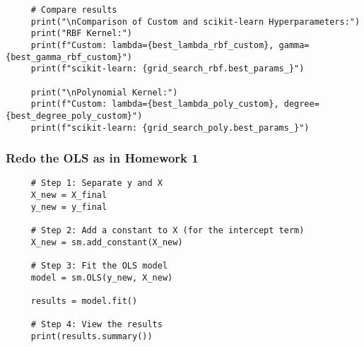 \documentclass[letterpaper]{article}
\begin{document}
\begin{lstlisting}
     # Compare results
     print("\nComparison of Custom and scikit-learn Hyperparameters:")
     print("RBF Kernel:")
     print(f"Custom: lambda={best_lambda_rbf_custom}, gamma={best_gamma_rbf_custom}")
     print(f"scikit-learn: {grid_search_rbf.best_params_}")
     
     print("\nPolynomial Kernel:")
     print(f"Custom: lambda={best_lambda_poly_custom}, degree={best_degree_poly_custom}")
     print(f"scikit-learn: {grid_search_poly.best_params_}")
\end{lstlisting}
\subsubsection{Redo the OLS as in Homework 1}
\begin{lstlisting}
     # Step 1: Separate y and X
     X_new = X_final
     y_new = y_final
     
     # Step 2: Add a constant to X (for the intercept term)
     X_new = sm.add_constant(X_new)
     
     # Step 3: Fit the OLS model
     model = sm.OLS(y_new, X_new)
     
     results = model.fit()
     
     # Step 4: View the results
     print(results.summary())
\end{lstlisting}
\end{document}
